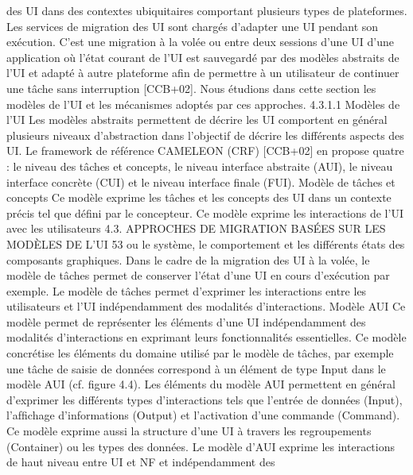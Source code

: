 \documentclass{article}
\begin{document}
des UI dans des contextes ubiquitaires comportant plusieurs types de plateformes. Les services de
migration des UI sont charg\'{e}s d’adapter une UI pendant son ex\'{e}cution. C’est une migration \`{a} la vol\'{e}e
ou entre deux sessions d’une UI d’une application o\`{u} l’\'{e}tat courant de l’UI est sauvegard\'{e} par des
mod\`{e}les abstraits de l’UI et adapt\'{e} \`{a} autre plateforme aﬁn de permettre \`{a} un utilisateur de continuer
une t\^{a}che sans interruption [CCB+02]. Nous \'{e}tudions dans cette section les mod\`{e}les de l’UI et les
m\'{e}canismes adopt\'{e}s par ces approches.
4.3.1.1
Mod\`{e}les de l’UI
Les mod\`{e}les abstraits permettent de d\'{e}crire les UI comportent en g\'{e}n\'{e}ral plusieurs niveaux d’abstraction dans l’objectif de d\'{e}crire les diff\'{e}rents aspects des UI. Le framework de r\'{e}f\'{e}rence CAMELEON (CRF) [CCB+02] en propose quatre : le niveau des t\^{a}ches et concepts, le niveau interface
abstraite (AUI), le niveau interface concr\`{e}te (CUI) et le niveau interface ﬁnale (FUI).
Mod\`{e}le de t\^{a}ches et concepts
Ce mod\`{e}le exprime les t\^{a}ches et les concepts des UI dans un contexte
pr\'{e}cis tel que d\'{e}ﬁni par le concepteur. Ce mod\`{e}le exprime les interactions de l’UI avec les utilisateurs
4.3. APPROCHES DE MIGRATION BASÉES SUR LES MODÈLES DE L’UI
53
ou le syst\`{e}me, le comportement et les diff\'{e}rents \'{e}tats des composants graphiques. Dans le cadre de
la migration des UI \`{a} la vol\'{e}e, le mod\`{e}le de t\^{a}ches permet de conserver l’\'{e}tat d’une UI en cours
d’ex\'{e}cution par exemple. Le mod\`{e}le de t\^{a}ches permet d’exprimer les interactions entre les utilisateurs
et l’UI ind\'{e}pendamment des modalit\'{e}s d’interactions.
Mod\`{e}le AUI
Ce mod\`{e}le permet de repr\'{e}senter les \'{e}l\'{e}ments d’une UI ind\'{e}pendamment des modalit\'{e}s d’interactions en exprimant leurs fonctionnalit\'{e}s essentielles. Ce mod\`{e}le concr\'{e}tise les \'{e}l\'{e}ments
du domaine utilis\'{e} par le mod\`{e}le de t\^{a}ches, par exemple une t\^{a}che de saisie de donn\'{e}es correspond
\`{a} un \'{e}l\'{e}ment de type Input dans le mod\`{e}le AUI (cf. ﬁgure 4.4). Les \'{e}l\'{e}ments du mod\`{e}le AUI permettent en g\'{e}n\'{e}ral d’exprimer les diff\'{e}rents types d’interactions tels que l’entr\'{e}e de donn\'{e}es (Input),
l’afﬁchage d’informations (Output) et l’activation d’une commande (Command). Ce mod\`{e}le exprime
aussi la structure d’une UI \`{a} travers les regroupements (Container) ou les types des donn\'{e}es.
Le mod\`{e}le d’AUI exprime les interactions de haut niveau entre UI et NF et ind\'{e}pendamment des
\end{document}
